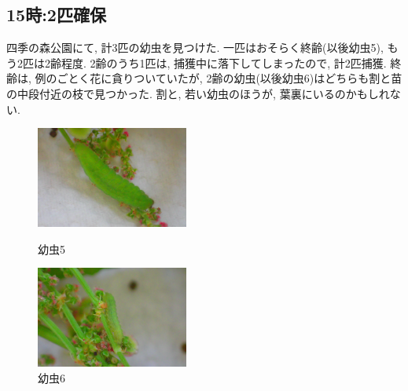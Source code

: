 \documentclass{jsarticle}
\begin{document}
\subsection{15時:2匹確保}
四季の森公園にて, 計3匹の幼虫を見つけた. 一匹はおそらく終齢(以後幼虫5), もう2匹は2齢程度. 2齢のうち1匹は, 捕獲中に落下してしまったので, 計2匹捕獲. 終齢は, 例のごとく花に貪りついていたが, 2齢の幼虫(以後幼虫6)はどちらも割と苗の中段付近の枝で見つかった. 
割と, 若い幼虫のほうが, 葉裏にいるのかもしれない. 
\begin{figure}[htbp]
  \begin{minipage}{0.5\hsize}
    \begin{center}
      \includegraphics[width=5cm]{photo4/Larva5.JPG}
    \end{center}
    \caption{幼虫5}
  \end{minipage}
  \begin{minipage}{0.5\hsize}
    \begin{center}
      \includegraphics[width=5cm]{photo4/Larva6.JPG}
    \end{center}
    \caption{幼虫6}
  \end{minipage}
\end{figure}
\end{document}
